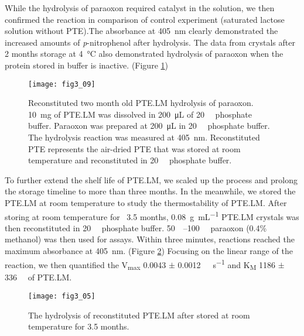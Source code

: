 \begin{refsection}
While the hydrolysis of paraoxon required catalyst in the solution, we then
confirmed the reaction in comparison of control experiment (saturated lactose
solution without PTE).The absorbance at \SI{405}{\nm} clearly demonstrated the
increased amounts of \emph{p}-nitrophenol after hydrolysis. The data from
crystals after 2 months storage at \SI{4}{\celsius} also demonstrated
hydrolysis of paraoxon when the protein stored in buffer is inactive. (Figure
\ref{fig:ptelm-two-month})
\begin{figure}[htbp] \centering \texttt{[image: fig3\_09]}
    \caption[Reconstituted two month old PTE.LM hydrolysis of paraoxon.
    \SI{10}{\mg} of PTE.LM was dissolved in \SI{200}{\micro\liter} of
\SI{20}{\milli\Molar} phosphate buffer. Paraoxon was prepared at
\SI{200}{\micro\liter} in \SI{20}{\milli\Molar} phosphate buffer. The
hydrolysis reaction was measured at \SI{405}{\nm}. Reconstituted PTE represents
the air-dried PTE that was stored at room temperature and reconstituted in
\SI{20}{\milli\Molar} phosphate buffer.] {Reconstituted two month old PTE.LM
    hydrolysis of paraoxon. \SI{10}{\mg} of PTE.LM was dissolved in
    \SI{200}{\micro\liter} of \SI{20}{\milli\Molar} phosphate buffer. Paraoxon
    was prepared at \SI{200}{\micro\liter} in \SI{20}{\milli\Molar} phosphate
    buffer. The hydrolysis reaction was measured at \SI{405}{\nm}.
    Reconstituted PTE represents the air-dried PTE that was stored at room
    temperature and reconstituted in \SI{20}{\milli\Molar} phosphate buffer.}
    \label{fig:ptelm-two-month} 
\end{figure}

To further extend the shelf life of PTE.LM, we scaled up the process and
prolong the storage timeline to more than three months. In the meanwhile, we
stored the PTE.LM at room temperature to study the thermostability of PTE.LM.
After storing at room temperature for ~3.5 months, \SI{0.08}{\gram\per\mL}
PTE.LM crystals was then reconstituted in \SI{20}{\milli\Molar} phosphate
buffer. \SIrange{50}{100}{\micro\Molar} paraoxon (0.4\% methanol) was then used
for assays. Within three minutes, reactions reached the maximum absorbance at
\SI{405}{\nm}. (Figure \ref{fig:ptelm-hydrolysis}) Focusing on the linear range
of the reaction, we then quantified the V\textsubscript{max} 0.0043 $\pm$
\SI{0.0012}{\micro\Molar\per\second} and K\textsubscript{M} 1186 $\pm$
\SI{336}{\micro\Molar} of PTE.LM. 
\begin{figure}[htbp] \centering \texttt{[image: fig3\_05]} 
    \caption[The hydrolysis of reconstituted PTE.LM after stored at room
    temperature for 3.5 months.]{The hydrolysis of reconstituted PTE.LM after
    stored at room temperature for 3.5 months.} \label{fig:ptelm-hydrolysis} 
\end{figure}


\end{refsection}
